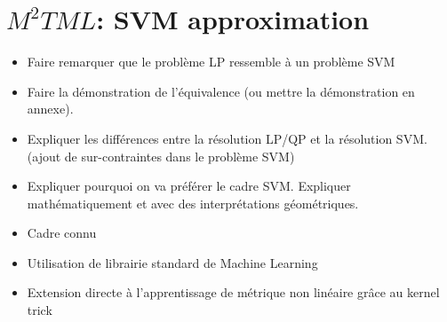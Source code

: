 \section{$M^2TML$: SVM approximation}
\begin{itemize}
	\item Faire remarquer que le problème LP ressemble à un problème SVM
	\item Faire la démonstration de l'équivalence (ou mettre la démonstration en annexe).
	\item Expliquer les différences entre la résolution LP/QP et la résolution SVM. (ajout de sur-contraintes dans le problème SVM)
	\item Expliquer pourquoi on va préférer le cadre SVM. Expliquer mathématiquement et avec des interprétations géométriques. 
	\item Cadre connu
	\item Utilisation de librairie standard de Machine Learning
	\item Extension directe à l'apprentissage de métrique non linéaire grâce au kernel trick
\end{itemize}

